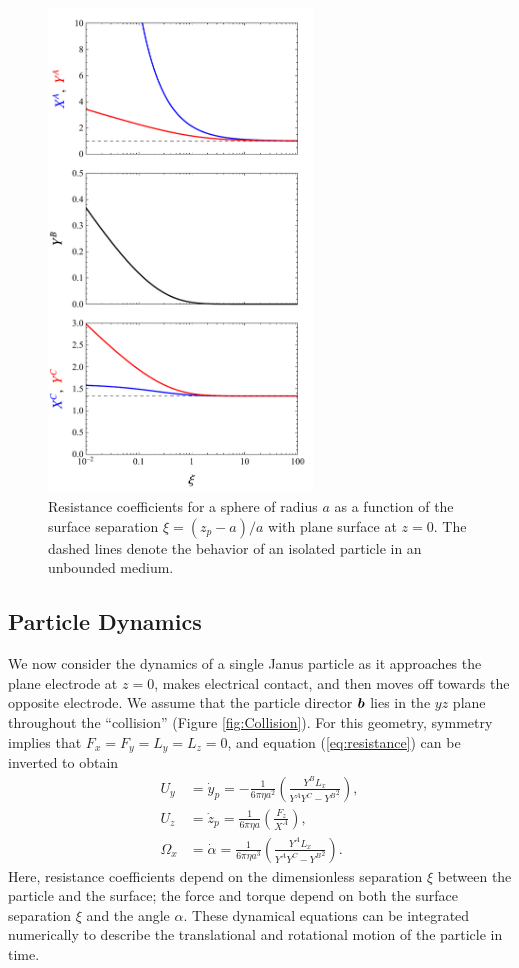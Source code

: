 \begin{appendices}
\begin{figure}[h]
    \centering
    \includegraphics[width=7cm]{figures/A1_resistance.pdf}
    \caption{Resistance coefficients for a sphere of radius $a$ as a function of the surface separation $\xi=(z_p-a)/a$ with plane surface at $z=0$. The dashed lines denote the behavior of an isolated particle in an unbounded medium.}
    \label{fig:resistance}
\end{figure}

\subsection{Particle Dynamics}

We now consider the dynamics of a single Janus particle as it approaches the plane electrode at $z=0$, makes electrical contact, and then moves off towards the opposite electrode. We assume that the particle director $\boldsymbol{b}$ lies in the $yz$ plane throughout the ``collision'' (Figure \ref{fig:Collision}).  For this geometry, symmetry implies that $F_x=F_y=L_y=L_z=0$, and equation (\ref{eq:resistance}) can be inverted to obtain
\begin{align}
    U_y &= \dot{y}_p =- \frac{1}{6\pi\eta a^2} \left(\frac{Y^B L_x}{Y^A Y^C - {Y^B}^2}\right),
    \\
    U_z &= \dot{z}_p = \frac{1}{6\pi\eta a} \left( \frac{F_z}{X^A}\right),
    \\
    \Omega_x &= \dot{\alpha} = \frac{1}{6\pi\eta a^3} \left(\frac{Y^A L_x}{Y^A Y^C - {Y^B}^2} \right).
\end{align}
Here, resistance coefficients depend on the dimensionless separation $\xi$ between the particle and the surface; the force and torque depend on both the surface separation $\xi$ and the angle $\alpha$. These dynamical equations can be integrated numerically to describe the translational and rotational motion of the particle in time. 


\end{appendices}
